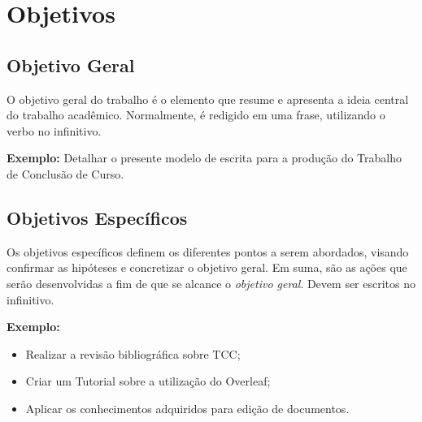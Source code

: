 \chapter{Objetivos}  \label{cap:02}



\section{Objetivo Geral}

O objetivo geral do trabalho é o elemento que resume e apresenta a ideia central do trabalho acadêmico. Normalmente, é redigido em uma frase, utilizando o verbo no infinitivo. 

\textbf{Exemplo:} Detalhar o presente modelo de escrita para a produção do Trabalho de Conclusão de Curso.\\


\section{Objetivos Específicos}

Os objetivos específicos definem os diferentes pontos a serem abordados, visando confirmar as hipóteses e concretizar o objetivo geral. Em suma, são as ações que serão desenvolvidas a fim de que se alcance o \textit{objetivo geral}. Devem ser escritos no infinitivo.

\textbf{Exemplo:}

\begin{itemize}
    \item Realizar a revisão bibliográfica sobre TCC;
    \item Criar um Tutorial sobre a utilização do Overleaf;
    \item Aplicar os conhecimentos adquiridos para edição de documentos.
\end{itemize}